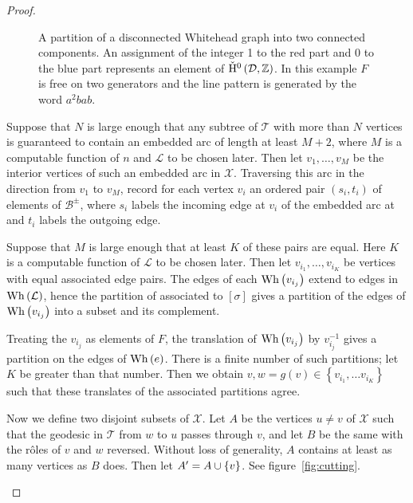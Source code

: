 \begin{proof}
\begin{figure}
\begin{tikzpicture}[scale=1]
\end{tikzpicture}

\caption{A partition of a disconnected Whitehead graph into two connected
components. An assignment of the integer 1 to the red part and 0 to the blue
part represents an element of $\cH{}^0\left(\mathcal{D}, \mathbb{Z}\right)$.
In this example $F$ is free on two generators and the line pattern is
generated by the word $a^2bab$.}
\label{fig:partition}
\end{figure}

Suppose that $N$ is large enough that any subtree of $\mathcal{T}$ with
more than $N$ vertices is guaranteed to contain an embedded arc of length at
least $M+2$, where $M$ is a computable function of $n$ and
$\mathcal{L}$ to be chosen later. Then let $v_1, \ldots, v_M$ be the
interior vertices of such an embedded arc in $\mathcal{X}$. Traversing this
arc in the direction from $v_1$ to $v_M$, record for each vertex $v_i$ an
ordered pair $\left(s_i, t_i\right)$ of elements of $\mathcal{B}^\pm$,
where $s_i$ labels the incoming edge at $v_i$ of the embedded arc at and
$t_i$ labels the outgoing edge.

Suppose that $M$ is large enough that at least $K$ of these pairs are
equal. Here $K$ is a computable function of $\mathcal{L}$ to be chosen
later. Then let $v_{i_1}, \ldots, v_{i_K}$ be vertices with equal associated
edge pairs. The edges of each $\Wh{v_{i_j}}$ extend to edges in
$\Wh{\mathcal{L}}$, hence the partition of  associated to
$\left[\sigma\right]$ gives a partition of the edges of $\Wh{v_{i_j}}$ into
a subset and its complement. 

Treating the $v_{i_j}$ as elements of $F$, the translation of
$\Wh{v_{i_j}}$ by $v_{i_j}^{-1}$ gives a partition on the edges of
$\Wh{e}$. There is a finite number of such partitions; let $K$ be greater
than that number. Then we obtain $v, w=g\left(v\right) \in \left\{v_{i_1},
\ldots v_{i_K}\right\}$ such that these translates of the associated
partitions agree.

Now we define two disjoint subsets of $\mathcal{X}$. Let $A$ be the
vertices $u \neq v$ of $\mathcal{X}$ such that the geodesic in
$\mathcal{T}$ from $w$ to $u$ passes through $v$, and let $B$ be the
same with the r\^oles of $v$ and $w$ reversed. Without loss of generality,
$A$ contains at least as many vertices as $B$ does. Then let $A' = A
\union \left\{v\right\}$. See figure~\ref{fig:cutting}.

\begin{figure}
\centering
\begin{tikzpicture}[scale=1]


\end{tikzpicture}
\end{figure}
\end{proof}
